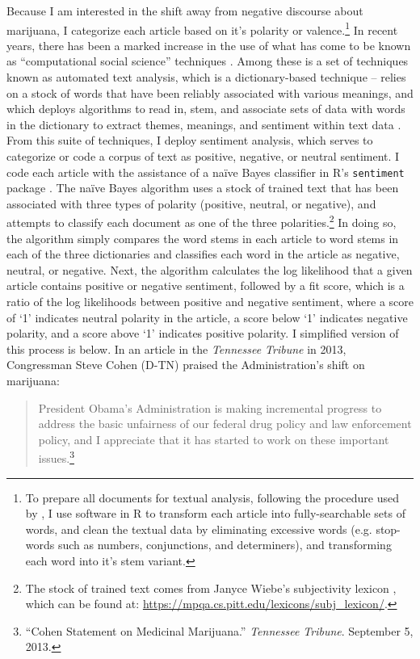 Because I am interested in the shift away from negative discourse about marijuana, I categorize each article based on it's polarity or valence.\footnote{To prepare all documents for textual analysis, following the procedure used by \citet{bail_2012}, I use software in R to transform each article into fully-searchable sets of words, and clean the textual data by eliminating excessive words (e.g. stop-words such as numbers, conjunctions, and determiners), and transforming each word into it's stem variant.} In recent years, there has been a marked increase in the use of what has come to be known as ``computational social science'' techniques \citep{bail_2016,dimaggio_2015,bail_2012}. Among these is a set of techniques known as automated text analysis, which is a dictionary-based technique -- relies on a stock of words that have been reliably associated with various meanings, and which deploys algorithms to read in, stem, and associate sets of data with words in the dictionary to extract themes, meanings, and sentiment within text data \citep{bail_2016}. From this suite of techniques, I deploy sentiment analysis, which serves to categorize or code a corpus of text as positive, negative, or neutral sentiment. I code each article with the assistance of a na\"{i}ve Bayes classifier in \textsf{R}'s \texttt{sentiment} package \citep{jurka_2012}. The na\"{i}ve Bayes algorithm uses a stock of trained text that has been associated with three types of polarity (positive, neutral, or negative), and attempts to classify each document as one of the three polarities.\footnote{The stock of trained text comes from Janyce Wiebe's subjectivity lexicon \citep{wilson_et_al_2005}, which can be found at: \url{https://mpqa.cs.pitt.edu/lexicons/subj_lexicon/}.} In doing so, the algorithm simply compares the word stems in each article to word stems in each of the three dictionaries and classifies each word in the article as negative, neutral, or negative. Next, the algorithm calculates the log likelihood that a given article contains positive or negative sentiment, followed by a fit score, which is a ratio of the log likelihoods between positive and negative sentiment, where a score of `1' indicates neutral polarity in the article, a score below `1' indicates negative polarity, and a score above `1' indicates positive polarity. I simplified version of this process is below. In an article in the \textit{Tennessee Tribune} in 2013, Congressman Steve Cohen (D-TN) praised the Administration's shift on marijuana: 

\begin{quotation}
\begin{singlespace}
\noindent President Obama's Administration is making incremental progress to address the basic unfairness of our federal drug policy and law enforcement policy, and I appreciate that it has started to work on these important issues.\footnote{``Cohen Statement on Medicinal Marijuana.'' \textit{Tennessee Tribune}. September 5, 2013.}
\end{singlespace}
\end{quotation}

